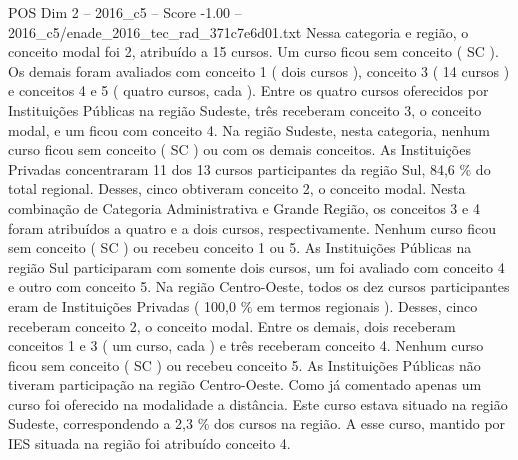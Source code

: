 \begin{textsample}{POS Dim 2 – 2016\_c5 – Score -1.00 – 2016\_c5/enade\_2016\_tec\_rad\_371c7e6d01.txt}
Nessa categoria e região, o conceito modal foi 2, atribuído a 15 cursos.
Um curso ficou sem conceito ( SC ).
Os demais foram avaliados com conceito 1 ( dois cursos ), conceito 3 ( 14 cursos ) e conceitos 4 e 5 ( quatro cursos, cada ).
Entre os quatro cursos oferecidos por Instituições Públicas na região Sudeste, três receberam conceito 3, o conceito modal, e um ficou com conceito 4.
Na região Sudeste, nesta categoria, nenhum curso ficou sem conceito ( SC ) ou com os demais conceitos.
As Instituições Privadas concentraram 11 dos 13 cursos participantes da região Sul, 84,6 \% do total regional.
Desses, cinco obtiveram conceito 2, o conceito modal.
Nesta combinação de Categoria Administrativa e Grande Região, os conceitos 3 e 4 foram atribuídos a quatro e a dois cursos, respectivamente.
Nenhum curso ficou sem conceito ( SC ) ou recebeu conceito 1 ou 5.
As Instituições Públicas na região Sul participaram com somente dois cursos, um foi avaliado com conceito 4 e outro com conceito 5.
Na região Centro-Oeste, todos os dez cursos participantes eram de Instituições Privadas ( 100,0 \% em termos regionais ).
Desses, cinco receberam conceito 2, o conceito modal.
Entre os demais, dois receberam conceitos 1 e 3 ( um curso, cada ) e três receberam conceito 4.
Nenhum curso ficou sem conceito ( SC ) ou recebeu conceito 5.
As Instituições Públicas não tiveram participação na região Centro-Oeste.
Como já comentado apenas um curso foi oferecido na modalidade a distância.
Este curso estava situado na região Sudeste, correspondendo a 2,3 \% dos cursos na região.
A esse curso, mantido por IES situada na região foi atribuído conceito 4.

\end{textsample}
